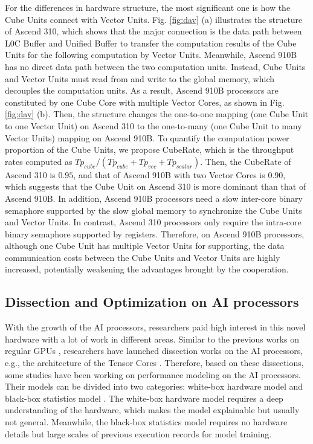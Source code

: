 For the differences in hardware structure, the most significant one is how the Cube Units connect with Vector Units. Fig. \ref{fig:dav} (a) illustrates the structure of Ascend 310, which shows that the major connection is the data path between L0C Buffer and Unified Buffer to transfer the computation results of the Cube Units for the following computation by Vector Units. Meanwhile, Ascend 910B has no direct data path between the two computation units. Instead, Cube Units and Vector Units must read from and write to the global memory, which decouples the computation units. As a result, Ascend 910B processors are constituted by one Cube Core with multiple Vector Cores, as shown in Fig. \ref{fig:dav} (b). Then, the structure changes the one-to-one mapping (one Cube Unit to one Vector Unit) on Ascend 310 to the one-to-many (one Cube Unit to many Vector Units) mapping on Ascend 910B. To quantify the computation power proportion of the Cube Units, we propose CubeRate, which is the throughput rates computed as $Tp_{cube} / (Tp_{cube} + Tp_{vec} + Tp_{scalar})$. Then, the CubeRate of Ascend 310 is $0.95$, and that of Ascend 910B with two Vector Cores is $0.90$, which suggests that the Cube Unit on Ascend 310 is more dominant than that of Ascend 910B. In addition, Ascend 910B processors need a slow inter-core binary semaphore supported by the slow global memory to synchronize the Cube Units and Vector Units. In contrast, Ascend 310 processors only require the intra-core binary semaphore supported by registers. Therefore, on Ascend 910B processors, although one Cube Unit has multiple Vector Units for supporting, the data communication costs between the Cube Units and Vector Units are highly increased, potentially weakening the advantages brought by the cooperation. 

\subsection{Dissection and Optimization on AI processors}
\label{Sec:1_1_3}

With the growth of the AI processors, researchers paid high interest in this novel hardware with a lot of work in different areas. Similar to the previous works on regular GPUs \cite{DBLP:conf/ppopp/ZhangTXLZC17}, researchers have launched dissection works on the AI processors, e.g., the architecture of the Tensor Cores \cite{DBLP:journals/corr/abs-1804-06826}. Therefore, based on these dissections, some studies have been working on performance modeling on the AI processors. Their models can be divided into two categories: white-box hardware model \cite{DBLP:conf/ispass/RaihanGA19} and black-box statistics model \cite{DBLP:conf/nips/ChenZYJMCGK18, DBLP:journals/corr/abs-2008-01040}. The white-box hardware model requires a deep understanding of the hardware, which makes the model explainable but usually not general. Meanwhile, the black-box statistics model requires no hardware details but large scales of previous execution records for model training. 

